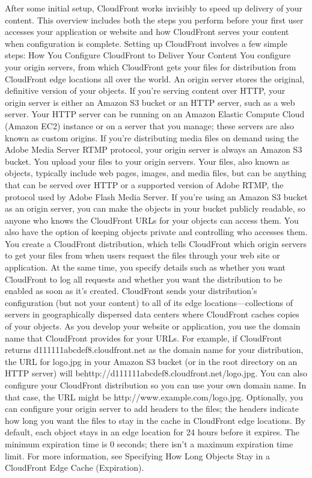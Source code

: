 After some initial setup, CloudFront works invisibly to speed up delivery of your content. This overview includes both the steps you perform before your first user accesses your application or website and how CloudFront serves your content when configuration is complete.
Setting up CloudFront involves a few simple steps:
How You Configure CloudFront to Deliver Your Content
You configure your origin servers, from which CloudFront gets your files for distribution from CloudFront edge locations all over the world.
An origin server stores the original, definitive version of your objects. If you're serving content over HTTP, your origin server is either an Amazon S3 bucket or an HTTP server, such as a web server. Your HTTP server can be running on an Amazon Elastic Compute Cloud (Amazon EC2) instance or on a server that you manage; these servers are also known as custom origins.
If you're distributing media files on demand using the Adobe Media Server RTMP protocol, your origin server is always an Amazon S3 bucket.
You upload your files to your origin servers. Your files, also known as objects, typically include web pages, images, and media files, but can be anything that can be served over HTTP or a supported version of Adobe RTMP, the protocol used by Adobe Flash Media Server.
If you're using an Amazon S3 bucket as an origin server, you can make the objects in your bucket publicly readable, so anyone who knows the CloudFront URLs for your objects can access them. You also have the option of keeping objects private and controlling who accesses them.
You create a CloudFront distribution, which tells CloudFront which origin servers to get your files from when users request the files through your web site or application. At the same time, you specify details such as whether you want CloudFront to log all requests and whether you want the distribution to be enabled as soon as it's created.
CloudFront sends your distribution's configuration (but not your content) to all of its edge locations—collections of servers in geographically dispersed data centers where CloudFront caches copies of your objects.
As you develop your website or application, you use the domain name that CloudFront provides for your URLs. For example, if CloudFront returns d111111abcdef8.cloudfront.net as the domain name for your distribution, the URL for logo.jpg in your Amazon S3 bucket (or in the root directory on an HTTP server) will behttp://d111111abcdef8.cloudfront.net/logo.jpg.
You can also configure your CloudFront distribution so you can use your own domain name. In that case, the URL might be http://www.example.com/logo.jpg.
Optionally, you can configure your origin server to add headers to the files; the headers indicate how long you want the files to stay in the cache in CloudFront edge locations. By default, each object stays in an edge location for 24 hours before it expires. The minimum expiration time is 0 seconds; there isn't a maximum expiration time limit. For more information, see Specifying How Long Objects Stay in a CloudFront Edge Cache (Expiration).


